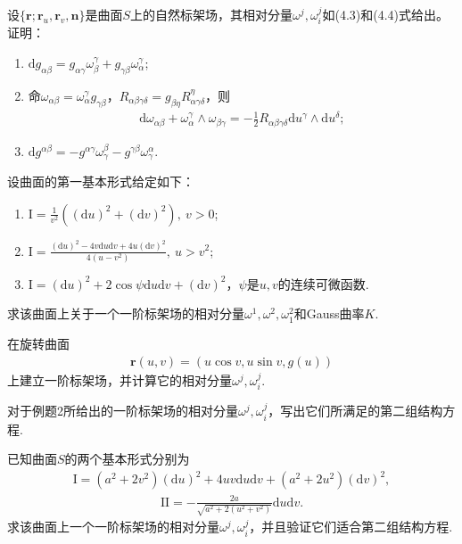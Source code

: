 \documentclass[../../main.tex]{subfiles}%
\begin{document}
\begin{example}
设$\{\bm{r};\bm{r}_u,\bm{r}_v,\bm{n}\}$是曲面$S$上的自然标架场，其相对分量$\omega^j,\omega_i^j$如(4.3)和(4.4)式给出。证明：
\begin{enumerate}[(1)]
\item $\mathrm{d}g_{\alpha\beta}=g_{\alpha\gamma}\omega_\beta^\gamma+g_{\gamma\beta}\omega_\alpha^\gamma$;
\item 命$\omega_{\alpha\beta}=\omega_\alpha^\gamma g_{\gamma\beta}$，$R_{\alpha\beta\gamma\delta}=g_{\beta\eta}R_{\alpha\gamma\delta}^\eta$，则
\begin{align*}
\mathrm{d}\omega_{\alpha\beta}+\omega_\alpha^\gamma\land\omega_{\beta\gamma}=-\frac{1}{2}R_{\alpha\beta\gamma\delta}\mathrm{d}u^\gamma\land\mathrm{d}u^\delta;
\end{align*}
\item $\mathrm{d}g^{\alpha\beta}=-g^{\alpha\gamma}\omega_\gamma^\beta-g^{\gamma\beta}\omega_\gamma^\alpha$.
\end{enumerate}
\end{example}

\begin{example}
设曲面的第一基本形式给定如下：
\begin{enumerate}[(1)]
\item $\mathrm{I}=\frac{1}{v^2}\left((\mathrm{d}u)^2+(\mathrm{d}v)^2\right),\ v>0$;
\item $\mathrm{I}=\frac{(\mathrm{d}u)^2-4v\mathrm{d}u\mathrm{d}v+4u(\mathrm{d}v)^2}{4\left(u-v^2\right)},\ u>v^2$;
\item $\mathrm{I}=(\mathrm{d}u)^2+2\cos\psi\mathrm{d}u\mathrm{d}v+(\mathrm{d}v)^2$，$\psi$是$u,v$的连续可微函数.
\end{enumerate}
求该曲面上关于一个一阶标架场的相对分量$\omega^1,\omega^2,\omega_1^2$和Gauss曲率$K$.
\end{example}

\begin{example}
在旋转曲面
\begin{align*}
\bm{r}(u,v)=(u\cos v,u\sin v,g(u))
\end{align*}
上建立一阶标架场，并计算它的相对分量$\omega^j,\omega_i^j$.
\end{example}

\begin{example}
对于例题2所给出的一阶标架场的相对分量$\omega^j,\omega_i^j$，写出它们所满足的第二组结构方程.
\end{example}

\begin{example}
已知曲面$S$的两个基本形式分别为
\begin{align*}
\mathrm{I}=(a^2+2v^2)(\mathrm{d}u)^2+4uv\mathrm{d}u\mathrm{d}v+(a^2+2u^2)(\mathrm{d}v)^2,
\end{align*}
\begin{align*}
\mathrm{II}=-\frac{2a}{\sqrt{a^2+2\left(u^2+v^2\right)}}\mathrm{d}u\mathrm{d}v.
\end{align*}
求该曲面上一个一阶标架场的相对分量$\omega^j,\omega_i^j$，并且验证它们适合第二组结构方程.
\end{example}
\end{document}
